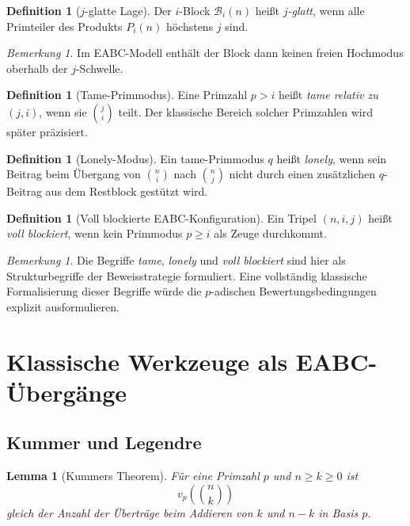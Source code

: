 \documentclass[12pt,a4paper]{article}
\theoremstyle{plain}
\newtheorem{lemma}[theorem]{Lemma}
\theoremstyle{definition}
\newtheorem{definition}[theorem]{Definition}
\theoremstyle{remark}
\newtheorem{remark}[theorem]{Bemerkung}
\begin{document}
	\begin{definition}[\(j\)-glatte Lage]
		Der \(i\)-Block \(\mathcal B_i(n)\) heißt \emph{\(j\)-glatt}, wenn alle Primteiler des Produkts \(P_i(n)\) höchstens \(j\) sind.
	\end{definition}
	
	\begin{remark}
		Im EABC-Modell enthält der Block dann keinen freien Hochmodus oberhalb der \(j\)-Schwelle.
	\end{remark}
	
	\begin{definition}[Tame-Primmodus]
		Eine Primzahl \(p>i\) heißt \emph{tame relativ zu \((j,i)\)}, wenn sie \(\binom{j}{i}\) teilt. Der klassische Bereich solcher Primzahlen wird später präzisiert.
	\end{definition}
	
	\begin{definition}[Lonely-Modus]
		Ein tame-Primmodus \(q\) heißt \emph{lonely}, wenn sein Beitrag beim Übergang von \(\binom{n}{i}\) nach \(\binom{n}{j}\) nicht durch einen zusätzlichen \(q\)-Beitrag aus dem Restblock gestützt wird.
	\end{definition}
	
	\begin{definition}[Voll blockierte EABC-Konfiguration]
		Ein Tripel \((n,i,j)\) heißt \emph{voll blockiert}, wenn kein Primmodus \(p\ge i\) als Zeuge durchkommt.
	\end{definition}
	
	\begin{remark}
		Die Begriffe \emph{tame}, \emph{lonely} und \emph{voll blockiert} sind hier als Strukturbegriffe der Beweisstrategie formuliert. Eine vollständig klassische Formalisierung dieser Begriffe würde die \(p\)-adischen Bewertungsbedingungen explizit ausformulieren.
	\end{remark}
	
	\section{Klassische Werkzeuge als EABC-Übergänge}
	
	\subsection{Kummer und Legendre}
	
	\begin{lemma}[Kummers Theorem]
		Für eine Primzahl \(p\) und \(n\ge k\ge0\) ist
		\[
		v_p\!\left(\binom{n}{k}\right)
		\]
		gleich der Anzahl der Überträge beim Addieren von \(k\) und \(n-k\) in Basis \(p\).
	\end{lemma}
	
\end{document}
